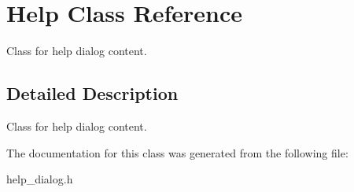 \hypertarget{classHelp}{}\section{Help Class Reference}
\label{classHelp}


Class for help dialog content.  




\subsection{Detailed Description}
Class for help dialog content. 

The documentation for this class was generated from the following file\+:\begin{DoxyCompactItemize}
\item 
help\+\_\+dialog.\+h\end{DoxyCompactItemize}
